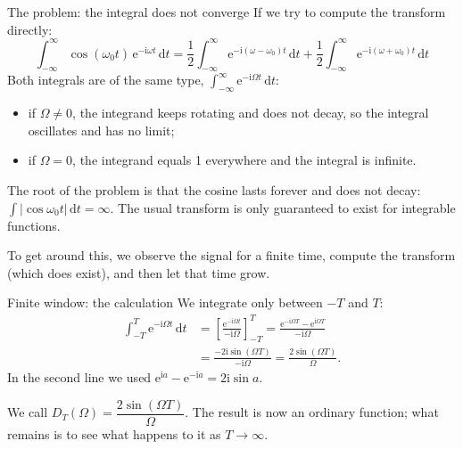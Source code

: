 \documentclass[11pt,aspectratio=169]{beamer}
\newcommand{\dd}{\,\mathrm{d}}
\newcommand{\ii}{\mathrm{i}}
\newcommand{\e}{\mathrm{e}}
\begin{document}
\begin{frame}{The problem: the integral does not converge}
  If we try to compute the transform directly:
  \[
    \int_{-\infty}^{\infty}\cos(\omega_0 t)\,\e^{-\ii\omega t}\dd t
    =\frac12\int_{-\infty}^{\infty}\e^{-\ii(\omega-\omega_0)t}\dd t
     +\frac12\int_{-\infty}^{\infty}\e^{-\ii(\omega+\omega_0)t}\dd t
  \]
  Both integrals are of the same type, $\int_{-\infty}^{\infty}\e^{-\ii\Omega t}\dd t$:
  \begin{itemize}
    \item if $\Omega\neq0$, the integrand keeps rotating and does not decay, so the integral
          oscillates and has no limit;
    \item if $\Omega=0$, the integrand equals 1 everywhere and the integral is infinite.
  \end{itemize}

  \vspace{2mm}
  The root of the problem is that the cosine lasts forever and does not decay:
  $\int|\cos\omega_0 t|\dd t=\infty$. The usual transform is only guaranteed to exist for
  integrable functions.

  \vspace{2mm}
  To get around this, we observe the signal for a finite time, compute the transform
  (which does exist), and then let that time grow.
\end{frame}

\begin{frame}{Finite window: the calculation}
  We integrate only between $-T$ and $T$:
  \begin{align*}
    \int_{-T}^{T}\e^{-\ii\Omega t}\dd t
    &=\left[\frac{\e^{-\ii\Omega t}}{-\ii\Omega}\right]_{-T}^{T}
     =\frac{\e^{-\ii\Omega T}-\e^{\ii\Omega T}}{-\ii\Omega}\\[1mm]
    &=\frac{-2\ii\sin(\Omega T)}{-\ii\Omega}
     =\frac{2\sin(\Omega T)}{\Omega}.
  \end{align*}
  In the second line we used $\e^{\ii a}-\e^{-\ii a}=2\ii\sin a$.

  \vspace{3mm}
  We call $D_T(\Omega)=\dfrac{2\sin(\Omega T)}{\Omega}$. The result is now an ordinary
  function; what remains is to see what happens to it as $T\to\infty$.
\end{frame}
\end{document}
